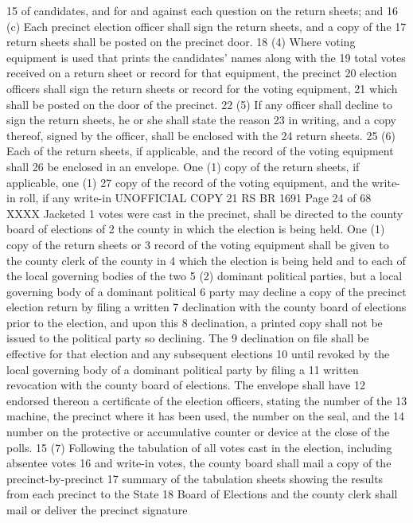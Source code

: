 15 of candidates, and for and against each question on the return sheets; and
16 (c) Each precinct election officer shall sign the return sheets, and a copy of the
17 return sheets shall be posted on the precinct door.
18 (4) Where voting equipment is used that prints the candidates' names along with the
19 total votes received on a return sheet or record for that equipment, the precinct
20 election officers shall sign the return sheets or record for the voting equipment,
21 which shall be posted on the door of the precinct.
22 (5) If any officer shall decline to sign the return sheets, he or she shall state the reason
23 in writing, and a copy thereof, signed by the officer, shall be enclosed with the
24 return sheets.
25 (6) Each of the return sheets, if applicable, and the record of the voting equipment shall
26 be enclosed in an envelope. One (1) copy of the return sheets, if applicable, one (1)
27 copy of the record of the voting equipment, and the write-in roll, if any write-in 
UNOFFICIAL COPY 21 RS BR 1691
Page 24 of 68
XXXX Jacketed
1 votes were cast in the precinct, shall be directed to the county board of elections of
2 the county in which the election is being held. One (1) copy of the return sheets or
3 record of the voting equipment shall be given to the county clerk of the county in
4 which the election is being held and to each of the local governing bodies of the two
5 (2) dominant political parties, but a local governing body of a dominant political
6 party may decline a copy of the precinct election return by filing a written
7 declination with the county board of elections prior to the election, and upon this
8 declination, a printed copy shall not be issued to the political party so declining. The
9 declination on file shall be effective for that election and any subsequent elections
10 until revoked by the local governing body of a dominant political party by filing a
11 written revocation with the county board of elections. The envelope shall have
12 endorsed thereon a certificate of the election officers, stating the number of the
13 machine, the precinct where it has been used, the number on the seal, and the
14 number on the protective or accumulative counter or device at the close of the polls.
15 (7) Following the tabulation of all votes cast in the election, including absentee votes
16 and write-in votes, the county board shall mail a copy of the precinct-by-precinct
17 summary of the tabulation sheets showing the results from each precinct to the State
18 Board of Elections and the county clerk shall mail or deliver the precinct signature
